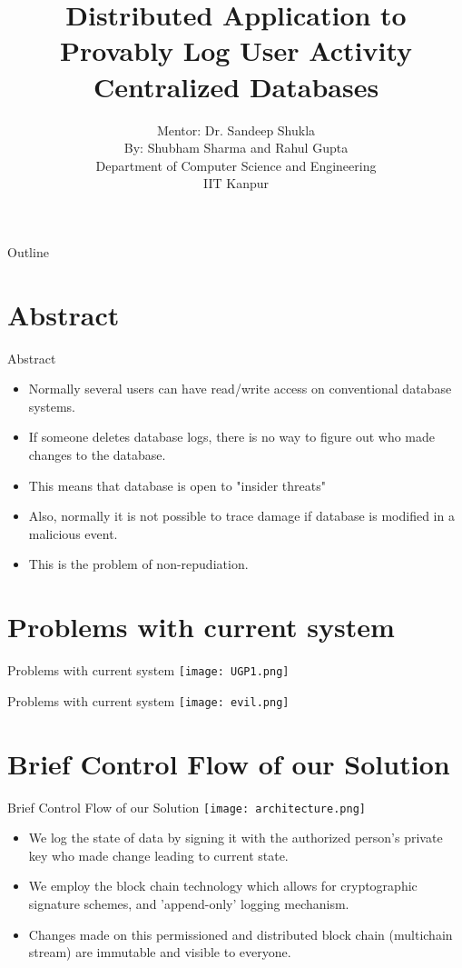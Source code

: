 \documentclass{beamer}
\title{ Distributed Application to Provably Log User Activity Centralized Databases }
\author{
        Mentor: Dr. Sandeep Shukla\\
        By: Shubham Sharma and Rahul Gupta\\
		Department of Computer Science and Engineering \\
		IIT Kanpur }
\date{}
\begin{document}
\begin{frame}
  \titlepage
\end{frame}

\begin{frame}{Outline}
  \tableofcontents
\end{frame}
\section{Abstract}
\begin{frame}{Abstract}
\begin{itemize}
    \item Normally several users can have read/write access on conventional database systems.
    \item If someone deletes database logs, there is no way to figure out who made changes to the database.
    \item This means that database is open to "insider threats"
    \item Also, normally it is not possible to trace damage if database is modified in a malicious event.
    \item This is the problem of non-repudiation.
\end{itemize}    
\end{frame}

\section{Problems with current system}
\begin{frame}{Problems with current system}
\texttt{[image: UGP1.png]}
\end{frame}

\begin{frame}{Problems with current system}
\texttt{[image: evil.png]}
\end{frame}
\section{Brief Control Flow of our Solution}
\begin{frame}{Brief Control Flow of our Solution}
\texttt{[image: architecture.png]}
\begin{itemize}
\item We log the state of data by signing it with the authorized person's private key who made change leading to current state. 
\item We employ the block chain technology which allows for cryptographic signature schemes, and 'append-only' logging mechanism.
\item Changes made on this permissioned and distributed block chain (multichain stream) are immutable and visible to everyone. 
\end{itemize}
\end{frame}
\end{document}
